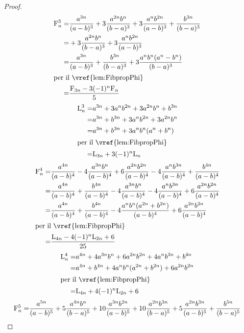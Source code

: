 \begin{proof}
\begin{align*}
\Fib{n}^3=&\dfrac{a^{3n}}{(a-b)^3}+3\dfrac{a^{2n}b^n}{(b-a)^3}+3\dfrac{a^nb^{2n}}{(a-b)^3}+\dfrac{b^{3n}}{(b-a)^3}\\
=&+3\dfrac{a^{2n}b^n}{(b-a)^3}+3\dfrac{a^nb^{2n}}{(a-b)^3}\\
=&\dfrac{a^{3n}}{(a-b)^3}+\dfrac{b^{3n}}{(b-a)^3}+3\dfrac{a^nb^n(a^n-b^n)}{(b-a)^3}\\
\intertext{per il~\vref{lem:FibpropPhi}}
=&\dfrac{\Fib{3n}-3(-1)^n\Fib{n}}{5}\\
\end{align*}
\begin{align*}
	\Luc{n}^3=&a^{3n} + 3a^{n}b^{2n} + 3a^{2n}b^{n} + b^{3n}\\
	=&a^{3n}  + b^{3n}+ 3a^{n}b^{2n} + 3a^{2n}b^{n}\\
	=&a^{3n}  + b^{3n}+ 3a^nb^n(a^n+b^n)\\
	\intertext{per il~\vref{lem:FibpropPhi}} 
	=&\Luc{3n}+3(-1)^n\Luc{n}
\end{align*}
\begin{align*}
	\Fib{n}^4=&\dfrac{a^{4n}}{(a-b)^4}-4\dfrac{a^{3n}b^{n}}{(a-b)^4}+6\dfrac{a^{2n}b^{2n}}{(a-b)^4}-4\dfrac{a^{n}b^{3n}}{(a-b)^4}+\dfrac{b^{4n}}{(a-b)^4}\\
	=&\dfrac{a^{4n}}{(a-b)^4}+\dfrac{b^{4n}}{(a-b)^4}-4\dfrac{a^{3n}b^{n}}{(a-b)^4}-4\dfrac{a^{n}b^{3n}}{(a-b)^4}+6\dfrac{a^{2n}b^{2n}}{(a-b)^4}\\
	=&\dfrac{a^{4n}}{(a-b)^4}+\dfrac{b^{4n}}{(a-b)^4}-4\dfrac{a^{n}b^{n}(a^{2n}+b^{2n})}{(a-b)^4}+6\dfrac{a^{2n}b^{2n}}{(a-b)^4}\\
	\intertext{per il~\vref{lem:FibpropPhi}} 
	=&\dfrac{\Luc{4n}-4(-1)^n\Luc{2n}+6}{25}
\end{align*}
\begin{align*}
	\Luc{n}^4=&a^{4n}+4a^{3n}b^{n}+6a^{2n}b^{2n}+4a^{n}b^{3n}+b^{4n}\\
	=&a^{4n}+b^{4n}+4a^{n}b^{n}(a^{2n}+b^{2n})+6a^{2n}b^{2n}\\
	\intertext{per il~\vref{lem:FibpropPhi}} 
	=&\Luc{4n}+4(-1)^n\Luc{2n}+6
\end{align*}
\begin{align*}
\Fib{n}^5=&\dfrac{a^{5n}}{(a-b)^5}+5\dfrac{a^{4n}b^{n}}{(b-a)^5}+10\dfrac{a^{3n}b^{2n}}{(a-b)^5}+10\dfrac{a^{2n}b^{3n}}{(b-a)^5}+5\dfrac{a^{2n}b^{3n}}{(a-b)^5}+\dfrac{b^{5n}}{(b-a)^5}\\

\end{align*}
\end{proof}
